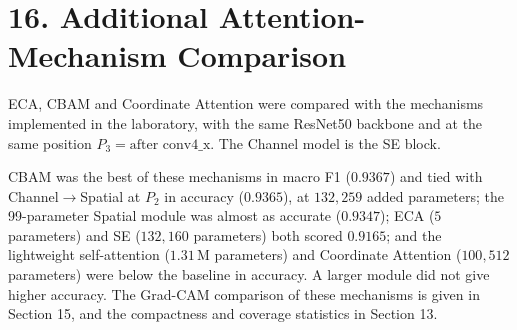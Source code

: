 \documentclass[10pt]{article}
\begin{document}
\section*{16. Additional Attention-Mechanism Comparison}

ECA, CBAM and Coordinate Attention were compared with the mechanisms
implemented in the laboratory, with the same ResNet50 backbone and at the
same position $P_3=\text{after conv4\_x}$. The Channel model is the SE
block.

\begin{center}

\end{center}

CBAM was the best of these mechanisms in macro F1 ($0.9367$) and tied with
Channel$\rightarrow$Spatial at $P_2$ in accuracy ($0.9365$), at $132{,}259$
added parameters; the 99-parameter Spatial module was almost as accurate
($0.9347$); ECA ($5$ parameters) and SE ($132{,}160$ parameters) both
scored $0.9165$; and the lightweight self-attention ($1.31$\,M parameters)
and Coordinate Attention ($100{,}512$ parameters) were below the baseline in
accuracy. A larger module did not give higher accuracy. The Grad-CAM
comparison of these mechanisms is given in Section 15, and the compactness
and coverage statistics in Section 13.
\end{document}

